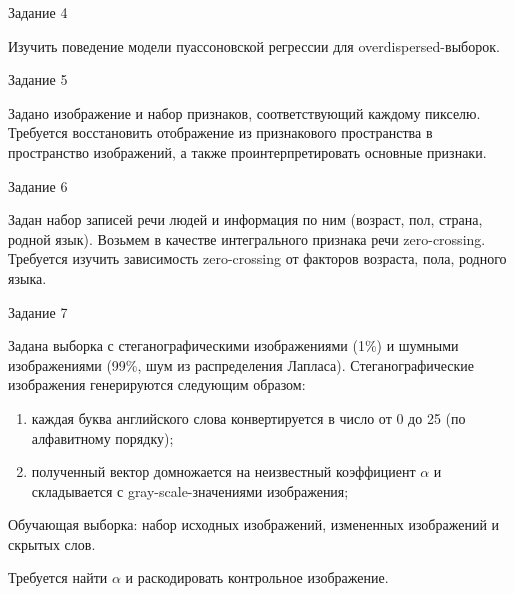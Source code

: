 \documentclass[9pt,pdf,utf8,hyperref={unicode},aspectratio=169]{beamer}
\begin{document}
\begin{frame}{Задание 4}
\begin{block}{}
Изучить поведение модели пуассоновской регрессии для overdispersed-выборок.
\end{block}
\end{frame}

\begin{frame}{Задание 5}
\begin{block}{}
Задано изображение и набор признаков, соответствующий каждому пикселю.
Требуется восстановить отображение из признакового пространства в пространство изображений, а также проинтерпретировать основные признаки. 
\end{block}
\end{frame}


\begin{frame}{Задание 6}
\begin{block}{}
Задан набор записей речи людей и информация по ним (возраст, пол, страна, родной язык). Возьмем в качестве интегрального признака речи zero-crossing.
Требуется изучить зависимость zero-crossing от факторов возраста, пола, родного языка.
\end{block}

\end{frame}

\begin{frame}{Задание 7}
\begin{block}{}
Задана выборка с стеганографическими изображениями  (1\%) и шумными изображениями (99\%, шум из распределения Лапласа). 
Стеганографические изображения генерируются следующим образом:
\begin{enumerate}
\item каждая буква английского слова конвертируется в число от 0 до 25 (по алфавитному порядку);
\item полученный вектор домножается на неизвестный коэффициент $\alpha$ и складывается с gray-scale-значениями изображения;
\end{enumerate}

Обучающая выборка: набор исходных изображений, измененных изображений и скрытых слов.

Требуется найти $\alpha$ и раскодировать контрольное изображение.
\end{block}
\end{frame}


\fi
\end{document}

